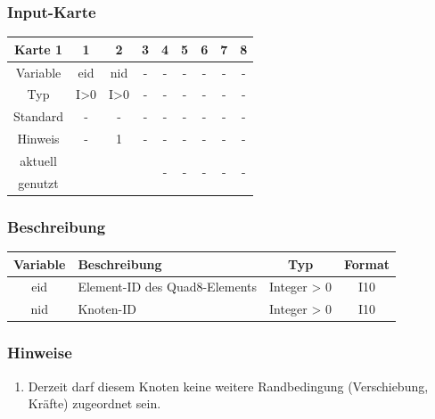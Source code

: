 \documentclass[11pt,titlepage,listof=totoc,bibliography=totoc,twoside]{scrreprt}
\begin{document}
{{\subsubsection{Input-Karte}

\begin{table}[htbp]
\centering
\begin{tabularx}{\textwidth}{cCCCCCCCC}
\toprule
Karte 1	& 1		& 2		& 3		& 4		& 5		& 6		& 7		& 8		\\
\midrule
Variable& eid		& nid		& -		& -		& -		& -		& -		& -		\\
Typ	& I>0		& I>0		& -		& -		& -		& -		& -		& -		\\
Standard& -		& -		& -		& -		& -		& -		& -		& -		\\
Hinweis	& -		& 1		& -		& -		& -		& -		& -		& -		\\
aktuell	& 	& 	& 	& 	& 	& \multirow{2}{*}{-}	& 	& 	\\
genutzt \\
\bottomrule
\end{tabularx}
\end{table}

\subsubsection{Beschreibung}

\begin{tabularx}{\textwidth}{cXcc}
\toprule
Variable& Beschreibung				& Typ		& Format\\
\midrule
eid	& Element-ID des Quad8-Elements		& Integer > 0	& I10	\\
nid	& Knoten-ID				& Integer > 0	& I10	\\
\bottomrule
\end{tabularx}

\subsubsection{Hinweise}

\begin{enumerate}
\item Derzeit darf diesem Knoten keine weitere Randbedingung (Verschiebung, Kräfte) zugeordnet sein.
\end{enumerate}

}}
\end{document}
